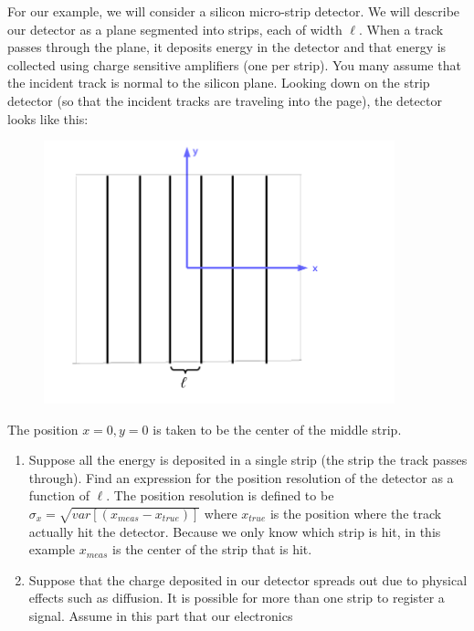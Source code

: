 \documentclass[12pt]{article}
\begin{document}
\begin{enumerate}
For our example, we will consider a silicon micro-strip detector.
We will describe our
detector as a plane segmented into strips, each of width $\ell$.  When
a track passes through the plane, it deposits energy in the detector
and that energy is collected using charge sensitive amplifiers (one per
strip).  You many assume that the incident track is normal to the 
silicon plane.  Looking down on the strip detector (so that the incident
tracks are traveling into the page), the
detector looks like this:
\vskip0.05in
\begin{figure}[h]
\begin{center}
\includegraphics[width=4.0in]{strips.png}
\end{center}
\end{figure}
The position $x=0, y=0$ is taken to be the center of the middle
strip.
\begin{enumerate}
\item Suppose all the energy is deposited in a single strip (the strip the
track passes through).  Find an expression for the position resolution
of the detector as a function of $\ell$. The position resolution is defined
to be $\sigma_x = \sqrt{var[(x_{meas}-x_{true})]}$ where $x_{true}$ is the 
position where the track actually hit the detector.  Because we only
know which strip is hit, in this example 
$x_{meas}$ is the center of the strip that is hit. 
\item Suppose that 
the charge deposited in our detector spreads out due
to physical effects such as diffusion. It is possible for more than
one strip to register a signal.  Assume in this part that our electronics

\end{enumerate}
\end{enumerate}
\end{document}
